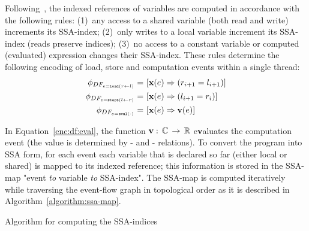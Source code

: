 Following~\cite{Porthos17b}, the indexed references of variables are computed in accordance with the following rules:
(1)~any access to a shared variable (both read and write) increments its SSA-index;
(2)~only writes to a local variable increment its SSA-index (reads preserve indices);
(3)~no access to a constant variable or computed (evaluated) expression changes their SSA-index.
These rules determine the following encoding of load, store and computation events within a single thread:
%
\begin{align}
    \phi_{DF_{e = \texttt{load}(r \leftarrow l)}}  \defeq \ & [\fx(e) \Rightarrow (r_{i+1} = l_{i+1})] \label{enc:df:load} \\
    \phi_{DF_{e = \texttt{store}(l \leftarrow r)}} \defeq \ & [\fx(e) \Rightarrow (l_{i+1} = r_i)] \label{enc:df:store} \\
    \phi_{DF_{e = \texttt{eval}(\cdot)}}           \defeq \ & [\fx(e) \Rightarrow \fv(e)] \label{enc:df:eval} %
\end{align}

In Equation~\ref{enc:df:eval}, the function $\mathbf{v}:\,\mathbb{C}\,\rightarrow\,\mathbb{R}$ e\textbf{v}aluates the computation event (the value is determined by \co- and \rf- relations).
To convert the program into SSA form, for each event each variable that is declared so far (either local or shared) is mapped to its indexed reference; this information is stored in the SSA-map "event \textit{to} variable \textit{to} SSA-index". %
The SSA-map is computed iteratively while traversing the event-flow graph in topological order as it is described in Algorithm~\ref{algorithm:ssa-map}.

\begin{algorithm}
    \caption{Algorithm for computing the SSA-indices}\label{alg:compute-ssa}
    \begin{algorithmic}[1]
                         
                        \EndIf
                    \EndFor
                \EndFor
            \EndFor
        \EndFunction
    \end{algorithmic}
    \label{algorithm:ssa-map}
\end{algorithm}

